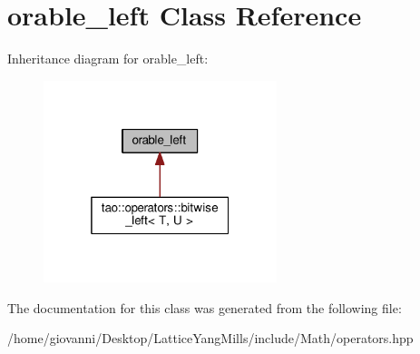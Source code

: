 \hypertarget{classorable__left}{}\section{orable\+\_\+left Class Reference}
\label{classorable__left}


Inheritance diagram for orable\+\_\+left\+:\nopagebreak
\begin{figure}[H]
\begin{center}
\leavevmode
\includegraphics[width=193pt]{classorable__left__inherit__graph}
\end{center}
\end{figure}


The documentation for this class was generated from the following file\+:\begin{DoxyCompactItemize}
\item 
/home/giovanni/\+Desktop/\+Lattice\+Yang\+Mills/include/\+Math/operators.\+hpp\end{DoxyCompactItemize}
